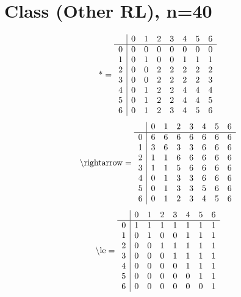 \documentclass[11pt]{article}
\begin{document}
\section{Class (Other RL), n=40}
\[\text{*} = 
\begin{array}{r | r r r r r r r}
 & 0 & 1 & 2 & 3 & 4 & 5 & 6 \\ \hline
0 & 0 & 0 & 0 & 0 & 0 & 0 & 0 \\
1 & 0 & 1 & 0 & 0 & 1 & 1 & 1 \\
2 & 0 & 0 & 2 & 2 & 2 & 2 & 2 \\
3 & 0 & 0 & 2 & 2 & 2 & 2 & 3 \\
4 & 0 & 1 & 2 & 2 & 4 & 4 & 4 \\
5 & 0 & 1 & 2 & 2 & 4 & 4 & 5 \\
6 & 0 & 1 & 2 & 3 & 4 & 5 & 6 \\
\end{array}
\]
\[\text{\textbackslash rightarrow} = 
\begin{array}{r | r r r r r r r}
 & 0 & 1 & 2 & 3 & 4 & 5 & 6 \\ \hline
0 & 6 & 6 & 6 & 6 & 6 & 6 & 6 \\
1 & 3 & 6 & 3 & 3 & 6 & 6 & 6 \\
2 & 1 & 1 & 6 & 6 & 6 & 6 & 6 \\
3 & 1 & 1 & 5 & 6 & 6 & 6 & 6 \\
4 & 0 & 1 & 3 & 3 & 6 & 6 & 6 \\
5 & 0 & 1 & 3 & 3 & 5 & 6 & 6 \\
6 & 0 & 1 & 2 & 3 & 4 & 5 & 6 \\
\end{array}
\]
\[\text{\textbackslash le} = 
\begin{array}{r | r r r r r r r}
 & 0 & 1 & 2 & 3 & 4 & 5 & 6 \\ \hline
0 & 1 & 1 & 1 & 1 & 1 & 1 & 1 \\
1 & 0 & 1 & 0 & 0 & 1 & 1 & 1 \\
2 & 0 & 0 & 1 & 1 & 1 & 1 & 1 \\
3 & 0 & 0 & 0 & 1 & 1 & 1 & 1 \\
4 & 0 & 0 & 0 & 0 & 1 & 1 & 1 \\
5 & 0 & 0 & 0 & 0 & 0 & 1 & 1 \\
6 & 0 & 0 & 0 & 0 & 0 & 0 & 1 \\
\end{array}
\]
\end{document}
